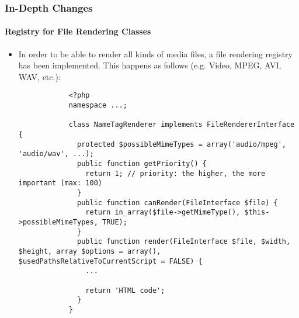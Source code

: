 
\begin{frame}[fragile]
	\frametitle{In-Depth Changes}
	\framesubtitle{Registry for File Rendering Classes}

	\lstset{
		basicstyle=\tiny\ttfamily
	}

	\begin{itemize}
		\item In order to be able to render all kinds of media files,
			a file rendering registry has been implemented.\newline
			This happens as follows (e.g. Video, MPEG, AVI, WAV, etc.):

		\begin{lstlisting}
			<?php
			namespace ...;

			class NameTagRenderer implements FileRendererInterface {
			  protected $possibleMimeTypes = array('audio/mpeg', 'audio/wav', ...);
			  public function getPriority() {
			    return 1; // priority: the higher, the more important (max: 100)
			  }
			  public function canRender(FileInterface $file) {
			    return in_array($file->getMimeType(), $this->possibleMimeTypes, TRUE);
			  }
			  public function render(FileInterface $file, $width, $height, array $options = array(), $usedPathsRelativeToCurrentScript = FALSE) {
			    ...

			    return 'HTML code';
			  }
			}
		\end{lstlisting}

	\end{itemize}

\end{frame}


